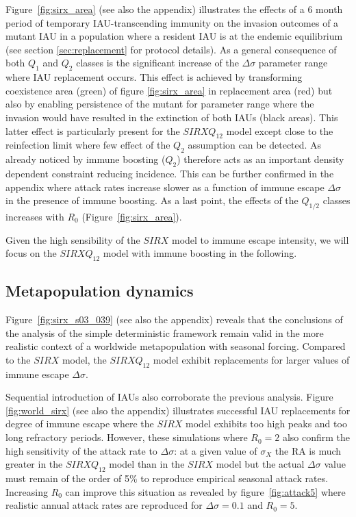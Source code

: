Figure~\ref{fig:sirx_area} (see also the appendix) illustrates the
effects of a 6 month period of temporary IAU-transcending immunity on
the invasion outcomes of a mutant IAU in a population where a resident
IAU is at the endemic equilibrium (see section \ref{sec:replacement}
for protocol details). As a general consequence of both $Q_{1}$ and
$Q_{2}$ classes is the significant increase of the $\Delta\sigma$
parameter range where IAU replacement occurs. This effect is achieved
by transforming coexistence area (green) of figure \ref{fig:sirx_area}
in replacement area (red) but also by enabling persistence of the
mutant for parameter range where the invasion would have resulted in
the extinction of both IAUs (black areas). This latter effect is
particularly present for the $SIRXQ_{12}$ model except close to the
reinfection limit where few effect of the $Q_{2}$ assumption can be
detected. As already noticed by \citet{Ferguson2003} immune boosting
($Q_{2}$) therefore acts as an important density dependent constraint
reducing incidence. This can be further confirmed in the appendix
where attack rates increase slower as a function of immune escape
$\Delta\sigma$ in the presence of immune boosting. As a last point,
the effects of the $Q_{1/2}$ classes increases with $R_{0}$
(Figure~\ref{fig:sirx_area}).

Given the high sensibility of the $SIRX$ model to immune escape
intensity, we will focus on the $SIRXQ_{12}$ model with immune
boosting in the following.

\subsection{Metapopulation dynamics}

Figure~\ref{fig:sirx_s03_039} (see also the appendix) reveals that the
conclusions of the analysis of the simple deterministic framework
remain valid in the more realistic context of a worldwide
metapopulation with seasonal forcing. Compared to the $SIRX$ model,
the $SIRXQ_{12}$ model exhibit replacements for larger values of
immune escape $\Delta\sigma$.

Sequential introduction of IAUs also corroborate the previous
analysis. Figure \ref{fig:world_sirx} (see also the appendix)
illustrates successful IAU replacements for degree of immune escape
where the $SIRX$ model exhibits too high peaks and too long refractory
periods. However, these simulations where $R_0=2$ also confirm the
high sensitivity of the attack rate to $\Delta\sigma$: at a given
value of $\sigma_{X}$ the RA is much greater in the $SIRXQ_{12}$ model
than in the $SIRX$ model but the actual $\Delta\sigma$ value must
remain of the order of 5\% to reproduce empirical seasonal attack
rates. Increasing $R_0$ can improve this situation as revealed by
figure~\ref{fig:attack5} where realistic annual attack rates are
reproduced for $\Delta \sigma=0.1$ and $R_0=5$.


